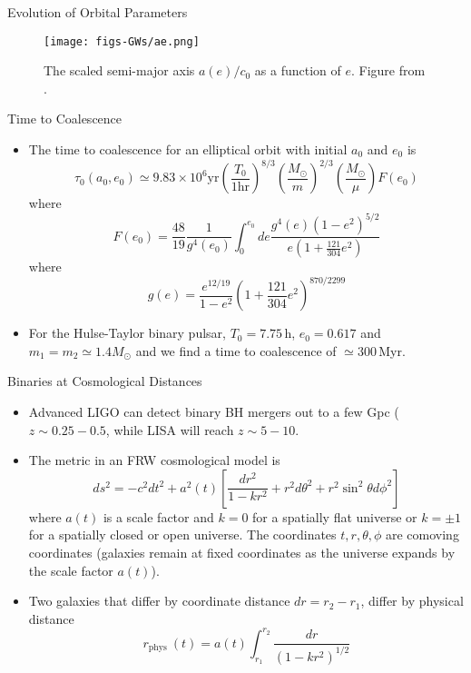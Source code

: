 \documentclass[size=11pt,style=paintings]{powerdot}
\begin{document}
  \begin{slide}{Evolution of Orbital Parameters}
 \begin{figure}
  \centering
  \texttt{[image: figs-GWs/ae.png]}
  \caption{The scaled semi-major axis $a(e)/c_0$ as a function of $e$. Figure from \cite{2008-Maggiore}.}
\label{fig:polarization}
\end{figure}
 \end{slide}
 
 
   \begin{slide}{Time to Coalescence}
 \begin{itemize}
 \item The time to coalescence for an elliptical orbit with initial $a_0$ and $e_0$ is
 $$
\boxed{\tau_{0}\left(a_{0}, e_{0}\right) \simeq 9.83 \times 10^6\mathrm{yr}\left(\frac{T_{0}}{1 \mathrm{hr}}\right)^{8 / 3}\left(\frac{M_{\odot}}{m}\right)^{2 / 3}\left(\frac{M_{\odot}}{\mu}\right) F\left(e_{0}\right)}
$$
where
$$
F\left(e_{0}\right)=\frac{48}{19} \frac{1}{g^{4}\left(e_{0}\right)} \int_{0}^{e_{0}} d e \frac{g^{4}(e)\left(1-e^{2}\right)^{5 / 2}}{e\left(1+\frac{121}{304} e^{2}\right)}
$$
where
$$
g(e)=\frac{e^{12 / 19}}{1-e^{2}}\left(1+\frac{121}{304} e^{2}\right)^{870 / 2299}
$$
\item For the Hulse-Taylor binary pulsar, $T_0=7.75\,$h, $e_0=0.617$ and $m_1=m_2\simeq1.4M_\odot$ and we find a time to coalescence of $\simeq 300\,$Myr.
 \end{itemize}
 \end{slide}
 
  \begin{slide}{Binaries at Cosmological Distances}
 \begin{itemize}
 \item Advanced LIGO can detect binary BH mergers out to a few Gpc ( $z\sim 0.25-0.5$, while LISA will reach  $z\sim
5-10$.

\vskip 0.3cm

\item The metric in an FRW cosmological model is
$$
d s^{2}=-c^{2} d t^{2}+a^{2}(t)\left[\frac{d r^{2}}{1-k r^{2}}+r^{2} d \theta^{2}+r^{2} \sin ^{2} \theta d \phi^{2}\right]
$$ 
where $a(t)$ is a scale factor and $k=0$ for a spatially flat universe or $k=\pm1$ for a spatially closed or open universe.
The coordinates $t,r,\theta,\phi$ are comoving coordinates (galaxies remain at fixed coordinates as the universe expands by the scale factor $a(t)$).

\vskip 0.3cm
\item Two galaxies that differ by coordinate distance $dr = r_2-r_1$, differ by physical distance
$$
r_{\text {phys }}(t)=a(t) \int_{r_1}^{r_2} \frac{d r}{\left(1-k r^{2}\right)^{1 / 2}}
$$

 \end{itemize}
 \end{slide}
 
\end{document}
